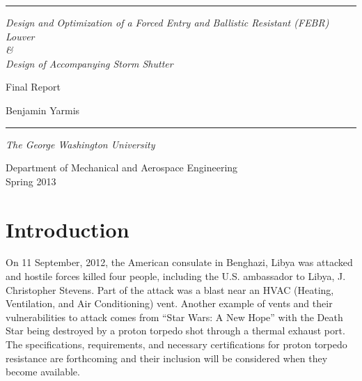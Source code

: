\documentclass[12pt,letterpaper]{report}
\begin{document}
	\begin{titlepage}
		\hrule
		\vfill 
		\begin{center}
			\begin{Huge}
				\textit{Design and Optimization of a Forced Entry and Ballistic Resistant (FEBR) Louver\\ \&\\ Design of Accompanying Storm Shutter}
			\end{Huge}
			\vfill 
			\begin{LARGE}
				Final Report\\
			\end{LARGE}
			\vfill 
			\begin{Large}
				Benjamin Yarmis\\
				\vfill
				\hrule
				\vfill 
				\textit{The George Washington University\\}
			\begin{large}
				Department of Mechanical and Aerospace Engineering\\
				Spring 2013\\
			\end{large}
				\end{Large}
			\end{center}
	\end{titlepage}
		
		\setcounter{secnumdepth}{0}
		\setcounter{tocdepth}{4}
		

			\makeatletter
			\def\@makeschapterhead#1{%
			{\parindent \z@ \raggedright
				\normalfont
				\interlinepenalty\@M
				\Huge \bfseries  #1\par\nobreak
				\vskip 40\p@
			}}
			\makeatother

		\tableofcontents

		
		\newpage
		
		\listoffigures

		\listoftables


		
		\chapter{Introduction}
		\vspace{-.25in}
		On 11 September, 2012, the American consulate in Benghazi, Libya was attacked and hostile forces killed four people, including the U.S. ambassador to Libya, J. Christopher Stevens.  Part of the attack was a blast near an HVAC (Heating, Ventilation, and Air Conditioning) vent.  Another example of vents and their vulnerabilities to attack comes from ``Star Wars: A New Hope'' with the Death Star being destroyed by a proton torpedo shot through a thermal exhaust port.  The specifications, requirements, and necessary certifications for proton torpedo resistance are forthcoming and their inclusion will be considered when they become available.
		
\end{document}
